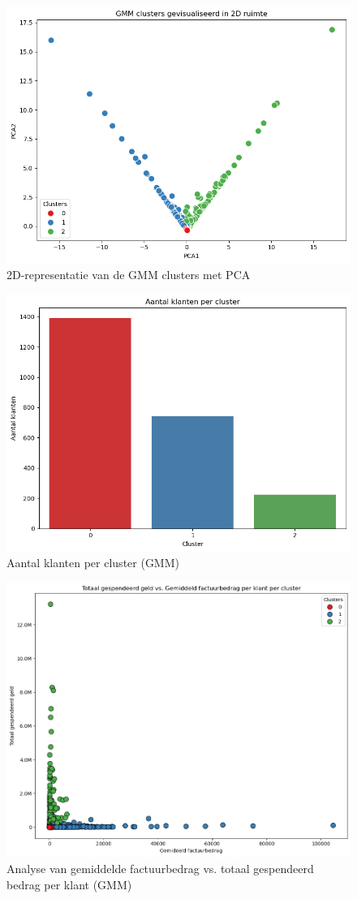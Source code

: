 \begin{figure}[H]
    \centering
    \includegraphics[width=0.8\linewidth]{images/GMM/AnalyseGMM}
    \caption{2D-representatie van de GMM clusters met PCA}
    \label{fig:PCA_GMM}
\end{figure}

\begin{figure}[H]
    \centering
    \includegraphics[width=0.8\linewidth]{images/GMM/AantalKlantenGMM}
    \caption{Aantal klanten per cluster (GMM)}
    \label{fig:Klanten_GMM}
\end{figure}

\begin{figure}[H]
    \centering
    \includegraphics[width=0.8\linewidth]{images/GMM/Analyse2GMM}
    \caption{Analyse van gemiddelde factuurbedrag vs. totaal gespendeerd bedrag per klant (GMM)}
    \label{fig:Analyse_GMM}
\end{figure}

